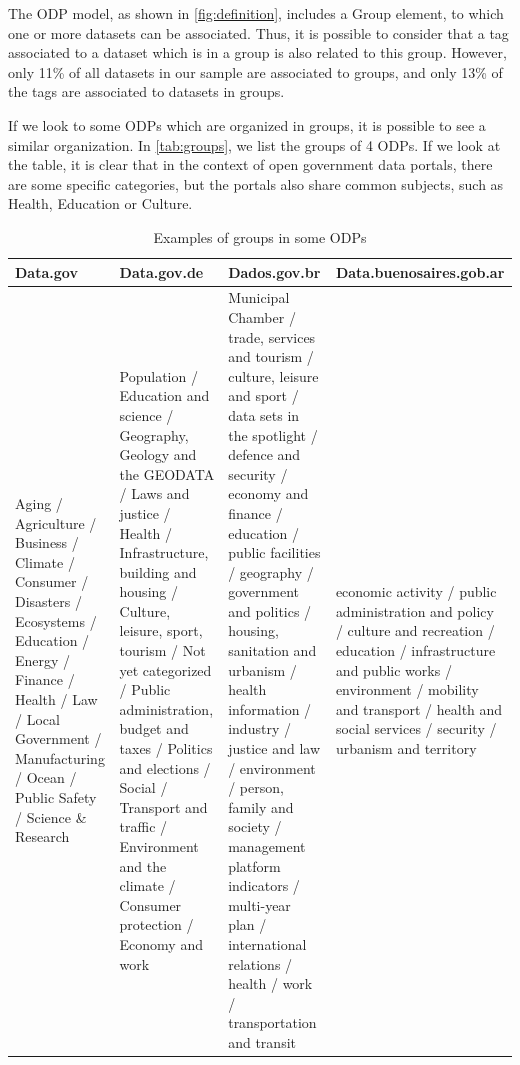 The ODP model, as shown in \autoref{fig:definition}, includes a Group element, to which one or more datasets can be associated.
Thus, it is possible to consider that a tag associated to a dataset which is in a group is also related to this group.
However, only 11\% of all datasets in our sample are associated to groups, and only 13\% of the tags are associated to datasets in groups.

If we look to some ODPs which are organized in groups, it is possible to see a similar organization.
In \autoref{tab:groups}, we list the groups of 4 ODPs. 
If we look at the table, it is clear that in the context of open government data portals, there are some specific categories, but the portals also share common subjects, such as Health, Education or Culture.

\begin{table}[]
\centering
\ABNTEXfontereduzida
\caption{Examples of groups in some ODPs}
\label{tab:groups}
\begin{tabular}{|p{3.2cm}|p{3.2cm}|p{3.2cm}|p{3.4cm}|}
\hline
Data.gov & Data.gov.de & Dados.gov.br & Data.buenosaires.gob.ar \\ \hline
Aging / Agriculture / Business / Climate / Consumer / Disasters / Ecosystems / Education / Energy / Finance / Health / Law / Local Government / Manufacturing / Ocean / Public Safety / Science \& Research &
Population / Education and science / Geography, Geology and the GEODATA / Laws and justice / Health / Infrastructure, building and housing / Culture, leisure, sport, tourism / Not yet categorized / Public administration, budget and taxes / Politics and elections / Social / Transport and traffic / Environment and the climate / Consumer protection / Economy and work &
Municipal Chamber
/ trade, services and tourism
/ culture, leisure and sport
/ data sets in the spotlight
/ defence and security
/ economy and finance
/ education
/ public facilities
/ geography
/ government and politics
/ housing, sanitation and urbanism
/ health information
/ industry
/ justice and law
/ environment
/ person, family and society
/ management platform indicators
/ multi-year plan
/ international relations
/ health
/ work
/ transportation and transit &
economic activity /
public administration and policy /
culture and recreation /
education /
infrastructure and public works /
environment /
mobility and transport /
health and social services /
security /
urbanism and territory \\\hline
\end{tabular}
\end{table}

